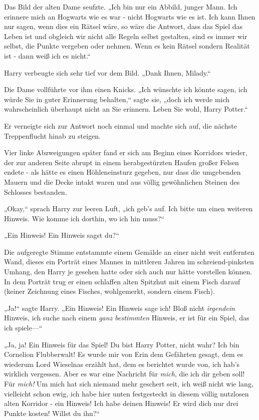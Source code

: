 {Das Bild der alten Dame seufzte. „Ich bin nur ein Abbild, junger Mann. Ich erinnere mich an Hogwarts wie es war - nicht Hogwarts wie es ist. Ich kann Ihnen nur sagen, wenn dies ein Rätsel wäre, so wäre die Antwort, dass das Spiel das Leben ist und obgleich wir nicht alle Regeln selbst gestalten, sind es immer wir selbst, die Punkte vergeben oder nehmen. Wenn es kein Rätsel sondern Realität ist - dann weiß ich es nicht.“

Harry verbeugte sich sehr tief vor dem Bild. „Dank Ihnen, Milady.“

Die Dame vollführte vor ihm einen Knicks. „Ich wünschte ich könnte sagen, ich würde Sie in guter Erinnerung behalten,“ sagte sie, „doch ich werde mich wahrscheinlich überhaupt nicht an Sie erinnern. Leben Sie wohl, Harry Potter.“

Er verneigte sich zur Antwort noch einmal und machte sich auf, die nächste Treppenflucht hinab zu steigen.

Vier linke Abzweigungen später fand er sich am Beginn eines Korridors wieder, der zur anderen Seite abrupt in einem herabgestürzten Haufen großer Felsen endete - als hätte es einen Höhleneinsturz gegeben, nur dass die umgebenden Mauern und die Decke intakt waren und aus völlig gewöhnlichen Steinen des Schlosses bestanden.

„Okay,“ sprach Harry zur leeren Luft, „ich geb's auf. Ich bitte um einen weiteren Hinweis. Wie komme ich dorthin, wo ich hin muss?“

„Ein Hinweis! Ein Hinweis sagst du?“

Die aufgeregte Stimme entstammte einem Gemälde an einer nicht weit entfernten Wand, dieses ein Porträt eines Mannes in mittleren Jahren im schreiend-pinksten Umhang, den Harry je gesehen hatte oder sich auch nur hätte vorstellen können. In dem Porträt trug er einen schlaffen alten Spitzhut mit einem Fisch darauf (keiner Zeichnung eines Fisches, wohlgemerkt, sondern einem Fisch).

„Ja!“ sagte Harry. „Ein Hinweis! Ein Hinweis sage ich! Bloß nicht \emph{irgendein} Hinweis, ich suche nach einem \emph{ganz bestimmten} Hinweis, er ist für ein Spiel, das ich spiele—“

„Ja, ja! Ein Hinweis für das Spiel! Du bist Harry Potter, nicht wahr? Ich bin Cornelion Flubberwalt! Es wurde mir von Erin dem Gefährten gesagt, dem es wiederum Lord Wieselnas erzählt hat, dem es berichtet wurde von, ich hab's wirklich vergessen. Aber es war eine Nachricht für \emph{mich}, die ich dir geben soll! Für \emph{mich!} Um mich hat sich niemand mehr geschert seit, ich weiß nicht wie lang, vielleicht schon ewig, ich habe hier unten festgesteckt in diesem völlig nutzlosen alten Korridor - ein Hinweis! Ich habe deinen Hinweis! Er wird dich nur drei Punkte kosten! Willst du ihn?“

}
